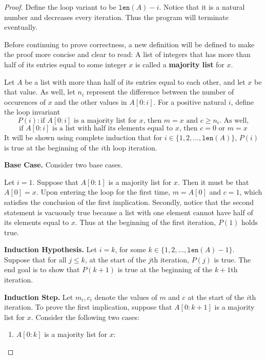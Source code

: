 \documentclass[11pt]{article}
\begin{document}
    \begin{proof}
        Define the loop variant to be \(\texttt{len}(A) - i\). Notice that it is a natural number and decreases every iteration. Thus the program will terminate eventually.

        Before continuing to prove correctness, a new definition will be defined to make the proof more concise and clear to read: A list of integers that has more than half of its entries equal to some integer \(x\) is called a \textbf{majority list} for \(x\).

        Let \(A\) be a list with more than half of its entries equal to each other, and let \(x\) be that value. As well, let \(n_i\) represent the difference between the number of occurences of \(x\) and the other values in \(A[0:i]\). For a positive natural \(i\), define the loop invariant
        \[
            P(i) : \text{if } A[0:i] \text{ is a majority list for } x \text{, then } m=x \text{ and } c \geq n_i \text{. As well,}
        \]
        \[
            \text{if } A[0:i] \text{ is a list with half its elements equal to } x \text{, then } c=0 \text{ or } m=x
        \]
        It will be shown using complete induction that for \(i \in \{1,2,...,\texttt{len}(A)\}\), \(P(i)\) is true at the beginning of the \(i\)th loop iteration.

        \textbf{Base Case.} Consider two base cases.
        
        Let \(i = 1\). Suppose that \(A[0:1]\) is a majority list for \(x\). Then it must be that \(A[0]=x\). Upon entering the loop for the first time, \(m=A[0]\) and \(c=1\), which satisfies the conclusion of the first implication. Secondly, notice that the second statement is vacuously true because a list with one element cannot have half of its elements equal to \(x\). Thus at the beginning of the first iteration, \(P(1)\) holds true.

        \textbf{Induction Hypothesis.} Let \(i=k\), for some \(k \in \{1,2,...,\texttt{len}(A) -1\}\). Suppose that for all \(j \leq k\), at the start of the \(j\)th iteration, \(P(j)\) is true. The end goal is to show that \(P(k+1)\) is true at the beginning of the \(k+1\)th iteration.

        \textbf{Induction Step.} Let \(m_i, c_i\) denote the values of \(m\) and \(c\) at the start of the \(i\)th iteration. To prove the first implication, suppose that \(A[0:k+1]\) is a majority list for \(x\). Consider the following two cases:
        \begin{enumerate}
            \item \(A[0:k]\) is a majority list for \(x\):
            

\end{enumerate}
\end{proof}
\end{document}
